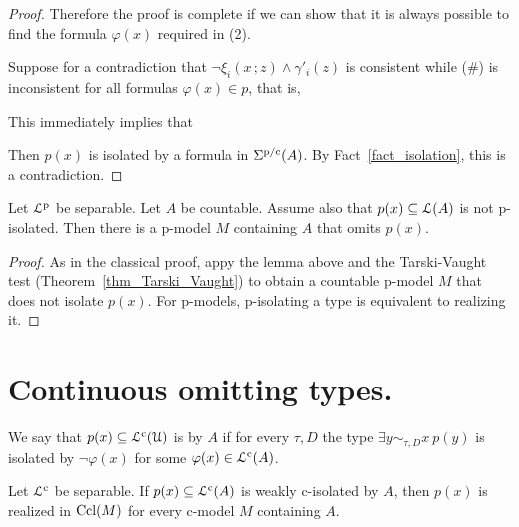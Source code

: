 \documentclass[10pt,oneside]{amsproc}
\renewcommand*{\emph}[1]{%
   \smash{\tikz[baseline]\node[rectangle, fill=teal!25, rounded corners, inner xsep=0.5ex, inner ysep=0.2ex, anchor=base, minimum height = 2.7ex]{\strut #1};}}
\begin{document}
{\begin{proof}
  Therefore the proof is complete if we can show that it is always possible to find the formula $\varphi(x)$ required in (2).
  
  Suppose for a contradiction that $\neg\xi_i(x\,;z)\wedge\gamma'_i(z)$ is consistent while (\#) is inconsistent for all formulas $\varphi(x)\in p$, that is, 
  
  
  This immediately implies that 
  
  
  Then $p(x)$ is isolated by a formula in $\Sigma^{\rm p/c}(A)$.
  By Fact~\ref{fact_isolation}, this is a contradiction.
\end{proof}

\begin{theorem}\label{prop_OTT}
  Let ${\EuScript L}^{\rm p}$ be separable.
  Let $A$ be countable.
  Assume also that $p(x)\subseteq{\EuScript L}(A)$ is not p-isolated.
  Then there is a p-model $M$ containing $A$ that omits $p(x)$. 
\end{theorem}

\begin{proof}
  As in the classical proof, appy the lemma above and the Tarski-Vaught test (Theorem~\ref{thm_Tarski_Vaught}) to obtain a countable p-model $M$ that does not isolate $p(x)$.
  For p-models, p-isolating a type is equivalent to  realizing it.
\end{proof}

\section{Continuous omitting types.}

We say that $p(x)\subseteq{\EuScript L}^{\rm c}({\EuScript U})$ is \emph{weakly c-isolated\/} by $A$ if for every $\tau,D$ the type $\exists y\sim_{\tau,D}x\ p(y)$ is isolated by $\neg\varphi(x)$ for some $\varphi(x)\in{\EuScript L}^{\rm c}(A)$.

\begin{fact}  
  Let ${\EuScript L}^{\rm c}$ be separable.
  If $p(x)\subseteq{\EuScript L}^{\rm c}(A)$ is weakly c-isolated by $A$, then $p(x)$ is realized in ${\rm Ccl}(M)$ for every c-model $M$ containing $A$.
\end{fact}

}
\end{document}
